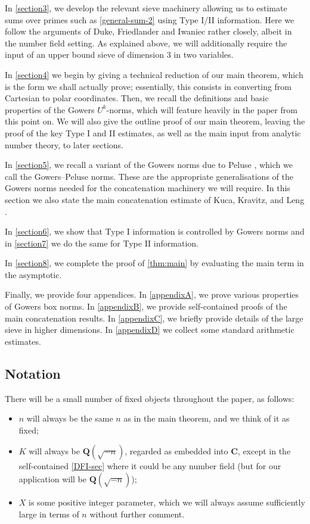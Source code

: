 \documentclass[11pt,reqno]{amsart}
\numberwithin{equation}{section}
\theoremstyle{definition}
\theoremstyle{remark}
\newcommand\Q{\mathbf{Q}}
\newcommand\C{\mathbf{C}}
\begin{document}
In \cref{section3}, we develop the relevant sieve machinery allowing us to estimate sums over primes such as \cref{general-sum-2} using Type I/II information. Here we follow the arguments of Duke, Friedlander and Iwaniec rather closely, albeit in the number field setting. As explained above, we will additionally require the input of an upper bound sieve of dimension 3 in two variables. 

In \cref{section4} we begin by giving a technical reduction of our main theorem, which is the form we shall actually prove; essentially, this consists in converting from Cartesian to polar coordinates. Then, we recall the definitions and basic properties of the Gowers $U^{k}$-norms, which will feature heavily in the paper from this point on. We will also give the outline proof of our main theorem, leaving the proof of the key Type I and II estimates, as well as the main input from analytic number theory, to later sections.

In \cref{section5}, we recall a variant of the Gowers norms due to Peluse \cite{Pel20}, which we call the Gowers--Peluse norms. These are the appropriate generalisations of the Gowers norms needed for the concatenation machinery we will require. In this section we also state the main concatenation estimate of Kuca, Kravitz, and Leng \cite{KKL24}. 

In \cref{section6}, we show that Type I information is controlled by Gowers norms and in \cref{section7} we do the same for Type II information. 

In \cref{section8}, we complete the proof of \cref{thm:main} by evaluating the main term in the asymptotic. 

Finally, we provide four appendices. In \cref{appendixA}, we prove various properties of Gowers box norms. In \cref{appendixB}, we provide self-contained proofs of the main concatenation results. In \cref{appendixC}, we briefly provide details of the large sieve in higher dimensions. In \cref{appendixD} we collect some standard arithmetic estimates. 



\subsection{Notation}\label{sec:notation} There will be a small number of fixed objects throughout the paper, as follows:
\begin{itemize}
\item $n$ will always be the same $n$ as in the main theorem, and we think of it as fixed;
\item $K$ will always be $\Q(\sqrt{-n})$, regarded as embedded into $\C$, except in the self-contained \cref{DFI-sec} where it could be any number field (but for our application will be $\Q(\sqrt{-n})$);
\item $X$ is some positive integer parameter, which we will always assume sufficiently large in terms of $n$ without further comment.
\end{itemize}
\end{document}
